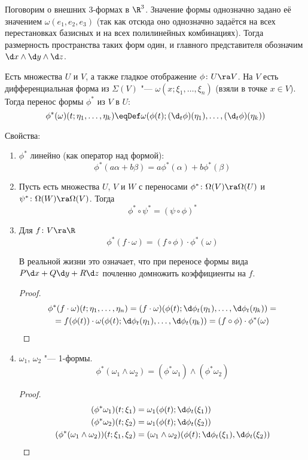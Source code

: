 \begin{Rem}
	Поговорим о внешних 3-формах в $\R^3$. Значение формы однозначно задано её значением $\omega(e_1, e_2, e_3)$
	(так как отсюда оно однозначно задаётся на всех перестановках базисных и на всех полилинейных комбинациях).
	Тогда размерность пространства таких форм один, и главного представителя обозначим $\d x \wedge \d y \wedge \d z$.
\end{Rem}

\begin{Def}
	Есть множества $U$ и $V$, а также гладкое отображение $\phi\colon U \ra V$.
	На $V$ есть дифференциальная форма из $\Sigma(V)$ "--- $\omega(x; \xi_1, \dots, \xi_n)$ (взяли в точке $x \in V$).
	Тогда перенос формы $\phi^*$ из $V$ в $U$:
	\[ \phi^*(\omega)(t;\eta_1,\dots,\eta_k) \eqDef \omega(\phi(t); (\d_t \phi)(\eta_1), \dots, (\d_t \phi)(\eta_k)) \]
\end{Def}

Свойства:
\begin{enumerate}
\item
	$\phi^*$ линейно (как оператор над формой):
	\[ \phi^*(a\alpha + b\beta) = a\phi^*(\alpha) + b\phi^*(\beta) \]

\item
	Пусть есть множества $U$, $V$ и $W$ с переносами $\phi^*\colon \Omega(V) \ra \Omega(U)$ и $\psi^*\colon \Omega(W) \ra \Omega(V)$.
	Тогда
	\[ \phi^* \circ \psi^* = (\psi \circ \phi)^* \]

\item
	Для $f\colon V \ra \R$
	\[ \phi^*(f \cdot \omega) = (f \circ \phi) \cdot \phi^*(\omega) \]
	\begin{Rem}
		В реальной жизни это означает, что при переносе формы вида $P \d x + Q \d y + R \d z$ почленно домножить коэффициенты на $f$.
	\end{Rem}
	\begin{proof}
		\begin{gather*}
			\phi^* (f \cdot \omega)(t;\eta_1, \dots, \eta_n)
			= (f \cdot \omega)(\phi(t); \d \phi_t(\eta_1), \dots, \d \phi_t(\eta_k)) = \\
			= f(\phi(t)) \cdot \omega (\phi(t); \d \phi_t(\eta_1), \dots, \d \phi_t(\eta_k))
			= (f \circ \phi) \cdot \phi^*(\omega)
		\end{gather*}
	\end{proof}

\item
	$\omega_1$, $\omega_2$ "--- 1-формы.
	\[ \phi^*(\omega_1 \wedge \omega_2) = (\phi^* \omega_1) \wedge (\phi^* \omega_2) \]
	\begin{proof}
		\begin{align*}
			(\phi^* \omega_1) (t; \xi_1) &= \omega_1(\phi(t); \d \phi_t(\xi_1)) \\
			(\phi^* \omega_2) (t; \xi_2) &= \omega_1(\phi(t); \d \phi_t(\xi_2)) \\
			(\phi^* (\omega_1 \wedge \omega_2)) (t; \xi_1, \xi_2) &= (\omega_1 \wedge \omega_2)(\phi(t); \d \phi_t(\xi_1), \d \phi_t(\xi_2))
		\end{align*}
	\end{proof}
\end{enumerate}

